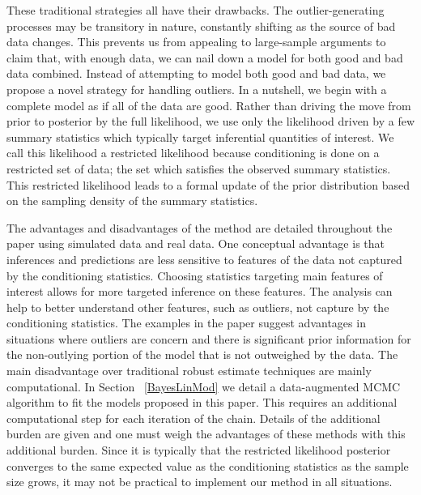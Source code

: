 \documentclass[ba]{imsart}
\newcommand{\response}[1]{{\color{blue}#1}}
\begin{document}
These traditional strategies  all have their drawbacks.  The outlier-generating processes 
may be transitory in nature, constantly shifting as the source of bad data changes.  This prevents us from appealing to large-sample arguments to claim that, with enough data, we can nail down a model for both good and bad data combined.  Instead of attempting to model both good and bad data, we propose a novel strategy for handling outliers. In a nutshell, we begin with a complete model  as if all of the data are good. Rather than driving the move from prior to posterior  by the full likelihood, we use only the likelihood driven by a few summary statistics which typically target inferential quantities
of interest.  We call this likelihood a restricted likelihood because conditioning is done on a restricted set of data; the set which satisfies the observed summary statistics. This restricted likelihood leads to a formal update of the prior distribution based on the sampling density of the summary statistics. 

\response{The advantages and disadvantages of the method are detailed throughout the paper using simulated data and real data. One conceptual advantage is that inferences and predictions are less sensitive to features of the data not captured by
the conditioning statistics. Choosing statistics targeting main features of interest allows for more targeted inference on these features. The analysis can help to better understand other features, such as outliers, not capture by the conditioning statistics.} 
\response{The examples in the paper suggest advantages in situations where outliers are concern and there is significant prior information for the non-outlying portion of the model that is not outweighed by the data. The main disadvantage over traditional robust estimate techniques are mainly computational. In Section ~\ref{BayesLinMod} we detail a data-augmented MCMC algorithm to fit the models proposed in this paper. This requires an additional computational step for each iteration of the chain. Details of the additional burden are given and one must weigh the advantages of these methods with this additional burden. Since it is typically that the restricted likelihood posterior converges to the same expected value as the conditioning statistics as the sample size grows, it may not be practical to implement our method in all situations.}
\end{document}
